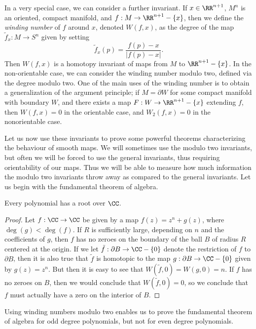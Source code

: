 In a very special case, we can consider a further invariant. If $x \in \RR^{n+1}$, $M^n$ is an oriented, compact manifold, and $f: M \to \RR^{n+1} - \{ x \}$, then we define the \emph{winding number} of $f$ around $x$, denoted $W(f,x)$, as the degree of the map $\tilde{f}_x: M \to S^n$ given by setting
%
\[ \tilde{f}_x(p) = \frac{f(p) - x}{|f(p) - x|}. \]
%
Then $W(f,x)$ is a homotopy invariant of maps from $M$ to $\RR^{n+1} - \{ x \}$. In the non-orientable case, we can consider the winding number modulo two, defined via the degree modulo two. One of the main uses of the winding number is to obtain a generalization of the argument principle; if $M = \partial W$ for some compact manifold with boundary $W$, and there exists a map $F: W \to \RR^{n+1} - \{ x \}$ extending $f$, then $W(f,x) = 0$ in the orientable case, and $W_2(f,x) = 0$ in the nonorientable case.

Let us now use these invariants to prove some powerful theorems characterizing the behaviour of smooth maps. We will sometimes use the modulo two invariants, but often we will be forced to use the general invariants, thus requiring orientability of our maps. Thus we will be able to measure how much information the modulo two invariants throw away as compared to the general invariants. Let us begin with the fundamental theorem of algebra.

\begin{theorem}
    Every polynomial has a root over $\CC$.
\end{theorem}
\begin{proof}
    Let $f: \CC \to \CC$ be given by a map $f(z) = z^n + g(z)$, where $\deg(g) < \deg(f)$. If $R$ is sufficiently large, depending on $n$ and the coefficients of $g$, then $f$ has no zeroes on the boundary of the ball $B$ of radius $R$ centered at the origin. If we let $\tilde{f}: \partial B \to \CC - \{ 0 \}$ denote the restriction of $f$ to $\partial B$, then it is also true that $\tilde{f}$ is homotopic to the map $g: \partial B \to \CC - \{ 0 \}$ given by $g(z) = z^n$. But then it is easy to see that $W(\tilde{f},0) = W(g,0) = n$. If $f$ has no zeroes on $B$, then we would conclude that $W(\tilde{f},0) = 0$, so we conclude that $f$ must actually have a zero on the interior of $B$.
\end{proof}

\begin{remark}
    Using winding numbers modulo two enables us to prove the fundamental theorem of algebra for odd degree polynomials, but not for even degree polynomials.
\end{remark}

